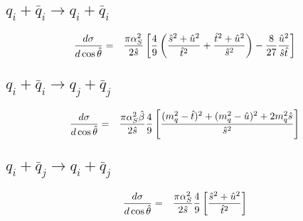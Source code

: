 \subsection{$q_i + \bar{q}_i \rightarrow q_i + \bar{q}_i$}
\begin{eqnarray}
{d\sigma \over d\cos\hat{\theta}} &=&
{\pi\alpha_S^2 \over 2\hat{s} } 
\left[ \frac{4}{9} \left( 
{\hat{s}^2 + \hat{u}^2 \over \hat{t}^2} + 
{\hat{t}^2 + \hat{u}^2 \over \hat{s}^2} \right) 
- \frac{8}{27}{\hat{u}^2 \over \hat{s}\hat{t}} \right] 
\end{eqnarray}


\subsection{$q_i + \bar{q}_i \rightarrow q_j + \bar{q}_j$}
\begin{eqnarray} 
{d\sigma \over d\cos\hat{\theta}} &=&
{\pi\alpha_S^2\hat{\beta} \over 2\hat{s} } 
\frac{4}{9} \left[ { (m^2_q -\hat{t})^2 + 
(m^2_q-\hat{u})^2 + 2m^2_q\hat{s} \over \hat{s}^2 } \right]
\end{eqnarray}

\subsection{$q_i + \bar{q}_j \rightarrow q_i + \bar{q}_j$}
\begin{eqnarray} 
{d\sigma \over d\cos\hat{\theta}} &=&
{\pi\alpha_S^2 \over 2\hat{s} } 
\frac{4}{9} \left[ {\hat{s}^2 + \hat{u}^2 \over \hat{t}^2 } \right]
\end{eqnarray}

